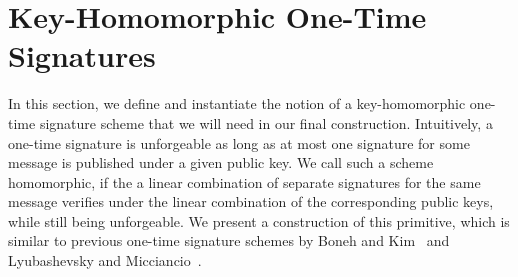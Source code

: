 
\section{Key-Homomorphic One-Time Signatures}\label{sec:otms}

In this section, we define and instantiate the notion of a key-homomorphic one-time signature scheme that we will need in our final construction.
Intuitively, a one-time signature is unforgeable as long as at most one signature for some message is published under a given public key.
We call such a scheme homomorphic, if the a linear combination of separate signatures for the same message verifies under the linear combination of the corresponding public keys, while still being unforgeable.
We present a construction of this primitive, which is similar to previous one-time signature schemes by Boneh and Kim~\cite{BonKim2020} and Lyubashevsky and Micciancio~\cite{TCC:LyuMic08}.

